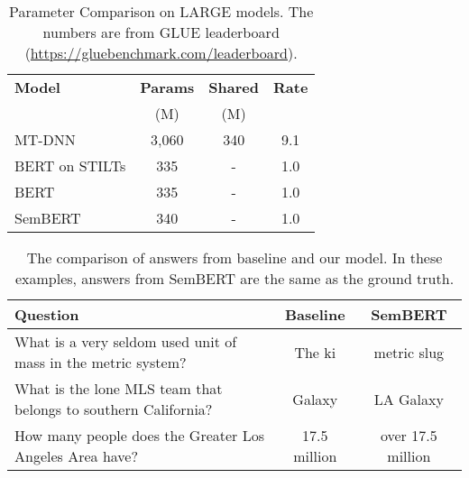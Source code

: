 \documentclass[letterpaper]{article} \usepackage{aaai20}  \usepackage{times}  \usepackage{helvet} \usepackage{courier}  \usepackage[hyphens]{url}  \usepackage{graphicx} \urlstyle{rm} \def\UrlFont{\rm}  \usepackage{graphicx}  \frenchspacing  \usepackage{amssymb}
\begin{document}
\begin{table} 
	\centering
			\begin{tabular}{l c c c}
				\hline
				
				\hline
				\textbf{Model} &  \textbf{Params} & \textbf{Shared }  &\textbf{Rate}   \\ 
				&  (M)  &  (M) & \\
				\hline
				MT-DNN & 3,060  & 340 & 9.1\\
				BERT on STILTs & 335 & - & 1.0\\
				BERT & 335 & - &  1.0\\
				SemBERT & 340 & - & 1.0\\
				\hline
				
				\hline
			\end{tabular}
		{
			\caption{\label{tab:glue_com} Parameter Comparison on LARGE models. The numbers are from GLUE leaderboard (\url{https://gluebenchmark.com/leaderboard}).}
		}
 \end{table}
 
 
\begin{table*}
	\centering
	{
		\begin{tabular}{l c c}
			\hline
			
			\hline
			Question & Baseline  & SemBERT\\
			\hline
			What is a very seldom used unit of mass in the metric system? & The ki &metric slug\\
What is the lone MLS team that belongs to southern California? &Galaxy  &LA Galaxy\\
			How many people does the Greater Los Angeles Area have?  & 17.5 million&over 17.5 million\\
			
			\hline
			
			\hline
		\end{tabular}
	}
	
	\caption{\label{tab:ans} The comparison of answers from baseline and our model. In these examples, answers from SemBERT are the same as the ground truth.}
\end{table*}
\end{document}
